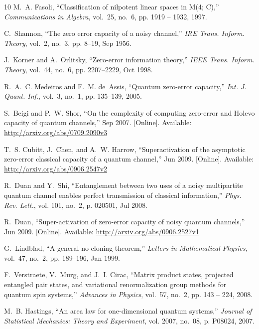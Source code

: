 \documentclass[journal,twoside]{IEEEtran}
\newcommand{\1}{\mathbbm{1}}
\renewcommand{\>}{\rangle}
\newcommand{\<}{\langle}
\begin{document}
\begin{thebibliography}{10}
M.~A. Fasoli, ``{Classification of nilpotent linear spaces in M(4; C)},''
  \emph{Communications in Algebra}, vol.~25, no.~6, pp. 1919 -- 1932, 1997.

C.~Shannon, ``The zero error capacity of a noisy channel,'' \emph{IRE Trans.
  Inform. Theory}, vol.~2, no.~3, pp. 8--19, Sep 1956.

J.~Korner and A.~Orlitsky, ``Zero-error information theory,'' \emph{IEEE Trans.
  Inform. Theory}, vol.~44, no.~6, pp. 2207--2229, Oct 1998.

R.~A.~C. Medeiros and F.~M. de~Assis, ``Quantum zero-error capacity,''
  \emph{Int. J. Quant. Inf.}, vol.~3, no.~1, pp. 135--139, 2005.

\BIBentryALTinterwordspacing
S.~Beigi and P.~W. Shor, ``{On the complexity of computing zero-error and
  Holevo capacity of quantum channels},'' Sep 2007. [Online]. Available:
  \url{http://arxiv.org/abs/0709.2090v3}
\BIBentrySTDinterwordspacing

\BIBentryALTinterwordspacing
T.~S. Cubitt, J.~Chen, and A.~W. Harrow, ``Superactivation of the asymptotic
  zero-error classical capacity of a quantum channel,'' Jun 2009. [Online].
  Available: \url{http://arxiv.org/abs/0906.2547v2}
\BIBentrySTDinterwordspacing

R.~Duan and Y.~Shi, ``Entanglement between two uses of a noisy multipartite
  quantum channel enables perfect transmission of classical information,''
  \emph{Phys. Rev. Lett.}, vol. 101, no.~2, p. 020501, Jul 2008.

\BIBentryALTinterwordspacing
R.~Duan, ``Super-activation of zero-error capacity of noisy quantum channels,''
  Jun 2009. [Online]. Available: \url{http://arxiv.org/abs/0906.2527v1}
\BIBentrySTDinterwordspacing

G.~Lindblad, ``A general no-cloning theorem,'' \emph{Letters in Mathematical
  Physics}, vol.~47, no.~2, pp. 189--196, Jan 1999.

F.~Verstraete, V.~Murg, and J.~I. Cirac, ``Matrix product states, projected
  entangled pair states, and variational renormalization group methods for
  quantum spin systems,'' \emph{Advances in Physics}, vol.~57, no.~2, pp. 143
  -- 224, 2008.

M.~B. Hastings, ``An area law for one-dimensional quantum systems,''
  \emph{Journal of Statistical Mechanics: Theory and Experiment}, vol. 2007,
  no.~08, p. P08024, 2007.


\end{thebibliography}
\end{document}
